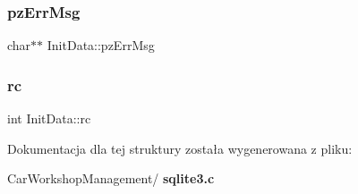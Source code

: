 \subsubsection{pzErrMsg}
{\footnotesize\ttfamily char$\ast$$\ast$ Init\+Data\+::pz\+Err\+Msg}

\mbox{\label{struct_init_data_a627153a3de2c4d159ae44ebc03961592}} 
\subsubsection{rc}
{\footnotesize\ttfamily int Init\+Data\+::rc}



Dokumentacja dla tej struktury została wygenerowana z pliku\+:\begin{DoxyCompactItemize}
\item 
Car\+Workshop\+Management/\textbf{ sqlite3.\+c}\end{DoxyCompactItemize}

